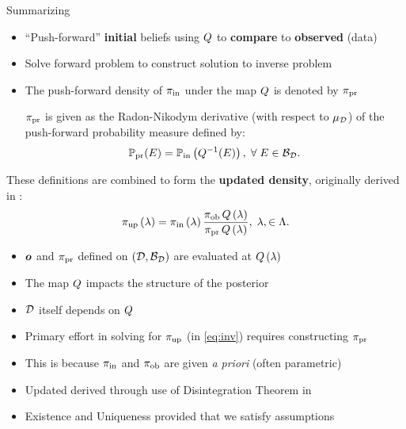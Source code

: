 \begin{frame}[t]{Summarizing}
\begin{itemize}
	\item ``Push-forward'' \textbf{initial} beliefs using $Q$ to \textbf{compare} to \textbf{observed} (data)
	\item Solve forward problem to construct solution to inverse problem
	\item The push-forward density of $\operatorname*{\pi_{in}}$ under the map $Q$ is denoted by $\operatorname*{\pi_{pr}}$

	\begin{defn}\label{defn:predicted}
		$\operatorname*{\pi_{pr}}$ is given as the Radon-Nikodym derivative (with respect to $\mu_{\mathcal{D}}$) of the push-forward probability measure defined by:
		\begin{equation}\label{eq:pred}
			\operatorname*{\mathbb{P}_{pr}} (E)  = \operatorname*{\mathbb{P}_{in}} \left ( Q^{-1}(E) \right ), \; \forall \; E \in \mathcal{B}_{\mathcal{D}}.
		\end{equation}
	\end{defn}

\end{itemize}

\end{frame}

\begin{frame}[t]
These definitions are combined to form the \textbf{updated density}, originally derived in \cite{BJW18}:
\begin{equation}\label{eq:post}
\operatorname*{\pi_{up}} \left ( \lambda \right ) = \operatorname*{\pi_{in}} \left ( \lambda \right ) \frac{\operatorname*{\pi_{ob}} Q\left ( \lambda \right ) }{\operatorname*{\pi_{pr}} Q\left ( \lambda \right ) }, \; \lambda, \in {\Lambda}.
\end{equation}

\begin{itemize}
	\item $\operatorname*{\boldsymbol{o}}$ and $\operatorname*{\pi_{pr}}$ defined on $(\mathcal{D}, \mathcal{B}_{\mathcal{D}})$ are evaluated at $Q\left ( \lambda \right )$
	\item The map $Q$ impacts the structure of the posterior
	\item $\mathcal{D}$ itself depends on $Q$
	\item Primary effort in solving for $\operatorname*{\pi_{up}}$ (in \eqref{eq:inv}) requires constructing $\operatorname*{\pi_{pr}}$
	\item This is because $\operatorname*{\pi_{in}}$ and $\operatorname*{\pi_{ob}}$ are given \emph{a priori} (often parametric)
	\item Updated derived through use of Disintegration Theorem in \cite{BJW18}
	\item Existence and Uniqueness provided that we satisfy assumptions
\end{itemize}
\end{frame}



